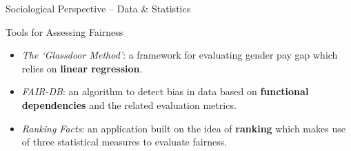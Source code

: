 \documentclass[usenames,dvipsnames]{beamer}
\begin{document}
    
    \begin{frame}{Sociological Perspective -- Data \& Statistics}
        \begin{figure}
            \hfill
        \end{figure}
    \end{frame}
    
    
    \begin{frame}{Tools for Assessing Fairness}
        \begin{itemize}
            \item \textit{The `Glassdoor Method'}: a framework for evaluating gender pay gap which relies on \textbf{linear regression}. \emph{\parencite{chamberlain2017analyze}}
            \item \textit{FAIR-DB}: an algorithm to detect bias in data based on \textbf{functional dependencies} and the related evaluation metrics. \emph{\parencite{azzalini2021fair}}
            \item \textit{Ranking Facts}: an application built on the idea of \textbf{ranking} which makes use of three statistical measures to evaluate fairness. \emph{\parencite{yang2018nutritional}}
        \end{itemize}
    \end{frame}
    
\end{document}
